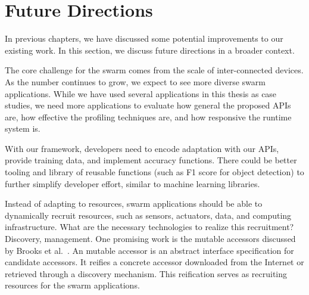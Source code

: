 \documentclass[thesis.tex]{subfiles}
\begin{document}
\section{Future Directions}
\label{sec:future-directions}

In previous chapters, we have discussed some potential improvements to our
existing work. In this section, we discuss future directions in a broader
context.

The core challenge for the swarm comes from the scale of inter-connected
devices. As the number continues to grow, we expect to see more diverse swarm
applications. While we have used several applications in this thesis as case
studies, we need more applications to evaluate how general the proposed APIs
are, how effective the profiling techniques are, and how responsive the runtime
system is.

With our framework, developers need to encode adaptation with our APIs, provide
training data, and implement accuracy functions. There could be better tooling
and library of reusable functions (such as F1 score for object detection) to
further simplify developer effort, similar to machine learning libraries.

Instead of adapting to resources, swarm applications should be able to
dynamically recruit resources, such as sensors, actuators, data, and computing
infrastructure. What are the necessary technologies to realize this recruitment?
Discovery, management. One promising work is the mutable accessors discussed by
Brooks et al.~\cite{brooks2018component}. An mutable accessor is an abstract
interface specification for candidate accessors. It reifies a concrete accessor
downloaded from the Internet or retrieved through a discovery mechanism. This
reification serves as recruiting resources for the swarm applications.
\end{document}
